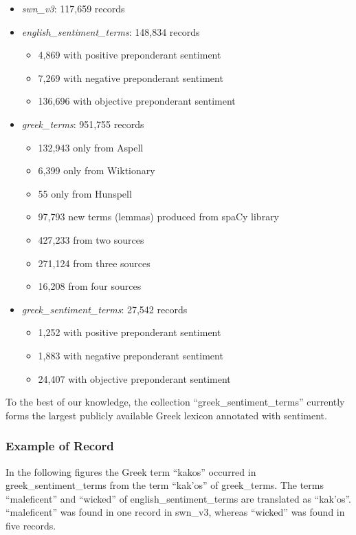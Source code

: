 \begin{itemize}
 \item \emph{swn\_v3}: 117,659 records
 \item \emph{english\_sentiment\_terms}: 148,834 records
 \begin{itemize}
  \item 4,869 with positive preponderant sentiment
  \item 7,269 with negative preponderant sentiment
  \item 136,696 with objective preponderant sentiment
 \end{itemize}
 \item \emph{greek\_terms}: 951,755 records
 \begin{itemize}
  \item 132,943 only from Aspell
  \item 6,399 only from Wiktionary
  \item 55 only from Hunspell
  \item 97,793 new terms (lemmas) produced from spaCy library
  \item 427,233 from two sources
  \item 271,124 from three sources
  \item 16,208 from four sources
 \end{itemize}
 \item \emph{greek\_sentiment\_terms}: 27,542 records
 \begin{itemize}
  \item 1,252 with positive preponderant sentiment
  \item 1,883 with negative preponderant sentiment
  \item 24,407 with objective preponderant sentiment
 \end{itemize} 
\end{itemize}

To the best of our knowledge,
the collection ``greek\_sentiment\_terms'' currently forms
the largest publicly available Greek lexicon annotated with sentiment.

\subsubsection{Example of Record}
\label{subsubsec:example}

In the following figures
the Greek term ``\textgreek{kakos}'' occurred in greek\_sentiment\_terms
from the term ``\textgreek{kak'os}'' of greek\_terms.
The terms ``maleficent'' and ``wicked'' of english\_sentiment\_terms
are translated as ``\textgreek{kak'os}''.
``maleficent'' was found in one record in swn\_v3,
whereas ``wicked'' was found in five records. \\

